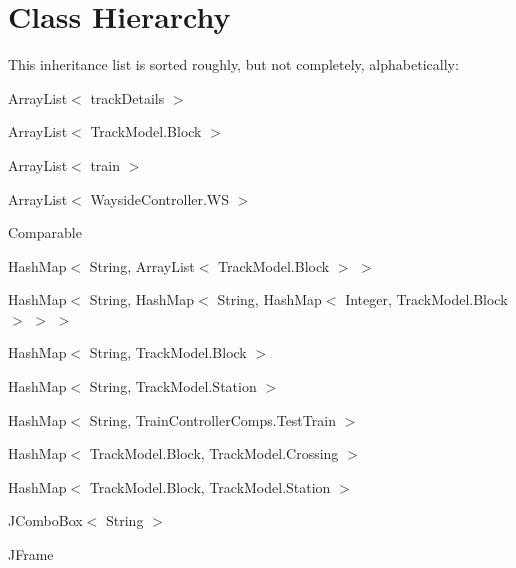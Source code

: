 \section{Class Hierarchy}
This inheritance list is sorted roughly, but not completely, alphabetically\+:\begin{DoxyCompactList}
\item Array\+List$<$ track\+Details $>$\item Array\+List$<$ Track\+Model.\+Block $>$\item Array\+List$<$ train $>$\item Array\+List$<$ Wayside\+Controller.\+WS $>$\item Comparable\begin{DoxyCompactList}
\item {}
\item {}
\end{DoxyCompactList}
\item {}
\item {}
\item {}
\item {}
\item {}
\item Hash\+Map$<$ String, Array\+List$<$ Track\+Model.\+Block $>$ $>$\item Hash\+Map$<$ String, Hash\+Map$<$ String, Hash\+Map$<$ Integer, Track\+Model.\+Block $>$ $>$ $>$\item Hash\+Map$<$ String, Track\+Model.\+Block $>$\item Hash\+Map$<$ String, Track\+Model.\+Station $>$\item Hash\+Map$<$ String, Train\+Controller\+Comps.\+Test\+Train $>$\item Hash\+Map$<$ Track\+Model.\+Block, Track\+Model.\+Crossing $>$\item Hash\+Map$<$ Track\+Model.\+Block, Track\+Model.\+Station $>$\item J\+Combo\+Box$<$ String $>$\item J\+Frame\begin{DoxyCompactList}

\end{DoxyCompactList}
\end{DoxyCompactList}
